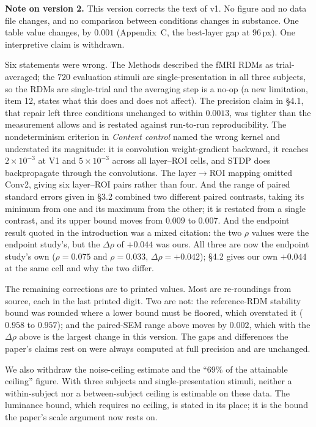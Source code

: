 \documentclass[10pt,twocolumn]{article}
\begin{document}
\textbf{Note on version 2.} This version corrects the text of v1. No figure and no data file changes, and no comparison between conditions changes in substance. One table value changes, by $0.001$ (Appendix~C, the best-layer gap at $96$\,px). One interpretive claim is withdrawn.

Six statements were wrong. The Methods described the fMRI RDMs as trial-averaged; the $720$ evaluation stimuli are single-presentation in all three subjects, so the RDMs are single-trial and the averaging step is a no-op (a new limitation, item 12, states what this does and does not affect). The precision claim in \S4.1, that repair left three conditions unchanged to within $0.0013$, was tighter than the measurement allows and is restated against run-to-run reproducibility. The nondeterminism criterion in \emph{Content control} named the wrong kernel and understated its magnitude: it is convolution weight-gradient backward, it reaches $2\times10^{-3}$ at V1 and $5\times10^{-3}$ across all layer--ROI cells, and STDP does backpropagate through the convolutions. The layer$\to$ROI mapping omitted Conv2, giving six layer--ROI pairs rather than four. And the range of paired standard errors given in \S3.2 combined two different paired contrasts, taking its minimum from one and its maximum from the other; it is restated from a single contrast, and its upper bound moves from $0.009$ to $0.007$. And the endpoint result quoted in the introduction was a mixed citation: the two $\rho$ values were the endpoint study's, but the $\Delta\rho$ of $+0.044$ was ours. All three are now the endpoint study's own ($\rho = 0.075$ and $\rho = 0.033$, $\Delta\rho = +0.042$); \S4.2 gives our own $+0.044$ at the same cell and why the two differ.

The remaining corrections are to printed values. Most are re-roundings from source, each in the last printed digit. Two are not: the reference-RDM stability bound was rounded where a lower bound must be floored, which overstated it ($0.958$ to $0.957$); and the paired-SEM range above moves by $0.002$, which with the $\Delta\rho$ above is the largest change in this version. The gaps and differences the paper's claims rest on were always computed at full precision and are unchanged.

We also withdraw the noise-ceiling estimate and the ``$69\%$ of the attainable ceiling'' figure. With three subjects and single-presentation stimuli, neither a within-subject nor a between-subject ceiling is estimable on these data. The luminance bound, which requires no ceiling, is stated in its place; it is the bound the paper's scale argument now rests on.
\end{document}
